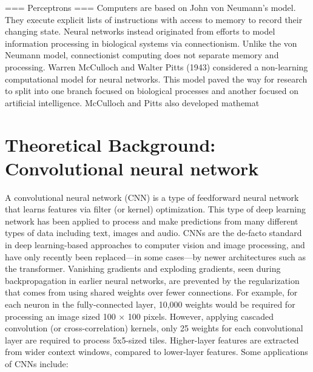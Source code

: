 \documentclass[12pt,a4paper]{report}
\begin{document}
=== Perceptrons ===
Computers are based on John von Neumann's model. They execute explicit lists of instructions with access to memory to record their changing state. Neural networks instead originated from efforts to model information processing in biological systems via connectionism. Unlike the von Neumann model, connectionist computing does not separate memory and processing.
Warren McCulloch and Walter Pitts (1943) considered a non-learning computational model for neural networks. This model paved the way for research to split into one branch focused on biological processes and another focused on artificial intelligence. McCulloch and Pitts also developed mathemat

\section{Theoretical Background: Convolutional neural network}
A convolutional neural network (CNN) is a type of feedforward neural network that learns features via filter (or kernel) optimization. This type of deep learning network has been applied to process and make predictions from many different types of data including text, images and audio. CNNs are the de-facto standard in deep learning-based approaches to computer vision and image processing, and have only recently been replaced—in some cases—by newer architectures such as the transformer.
Vanishing gradients and exploding gradients, seen during backpropagation in earlier neural networks, are prevented by the regularization that comes from using shared weights over fewer connections. For example, for each neuron in the fully-connected layer, 10,000 weights would be required for processing an image sized 100 × 100 pixels. However, applying cascaded convolution (or cross-correlation) kernels, only 25 weights for each convolutional layer are required to process 5x5-sized tiles. Higher-layer features are extracted from wider context windows, compared to lower-layer features.
Some applications of CNNs include: 
\end{document}
